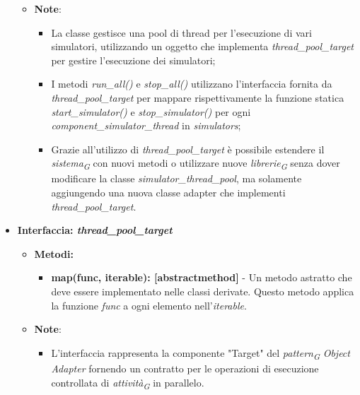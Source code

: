 \begin{itemize}
\begin{itemize}
        \item\textbf{Note}:
        \begin{itemize}
            \item La classe gestisce una pool di thread per l'esecuzione di vari simulatori, utilizzando un oggetto che implementa \textit{thread\_pool\_target} per gestire l'esecuzione dei simulatori;
            \item I metodi \textit{run\_all()} e \textit{stop\_all()} utilizzano l'interfaccia fornita da \textit{thread\_pool\_target} per mappare rispettivamente la funzione statica \textit{start\_simulator()} e \textit{stop\_simulator()} per ogni \textit{component\_simulator\_thread} in \textit{simulators};
            \item Grazie all'utilizzo di \textit{thread\_pool\_target} è possibile estendere il \textit{sistema}\textsubscript{\textit{G}} con nuovi metodi o utilizzare nuove \textit{librerie}\textsubscript{\textit{G}} senza dover modificare la classe \textit{simulator\_thread\_pool}, ma solamente aggiungendo una nuova classe adapter che implementi \textit{thread\_pool\_target}.
        \end{itemize}
    \end{itemize}

    \item{\textbf{Interfaccia: \textit{thread\_pool\_target}}}
    \begin{itemize}
        \item\textbf{Metodi:}
        \begin{itemize}
            \item \textbf{map(func, iterable): [abstractmethod]} - Un metodo astratto che deve essere implementato nelle classi derivate. Questo metodo applica la funzione \textit{func} a ogni elemento nell'\textit{iterable}.
        \end{itemize}
        \item\textbf{Note}:
        \begin{itemize}
            \item L'interfaccia rappresenta la componente "Target" del \textit{pattern}\textsubscript{\textit{G}} \textit{Object Adapter} fornendo un contratto per le operazioni di esecuzione controllata di \textit{attività}\textsubscript{\textit{G}} in parallelo.
        \end{itemize}
    \end{itemize}


\end{itemize}
